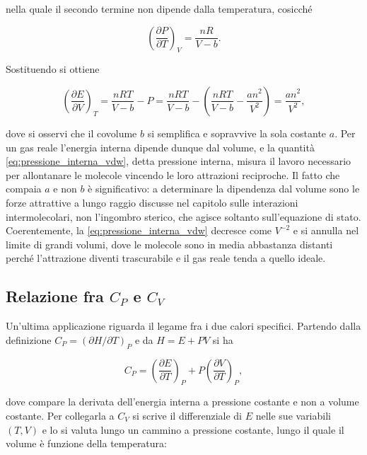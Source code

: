 nella quale il secondo termine non dipende dalla temperatura, cosicché

\begin{equation}
    \left(\frac{\partial P}{\partial T}\right)_V = \frac{nR}{V - b} .
    \label{eq:derivata_vdw}
\end{equation}

Sostituendo si ottiene

\begin{equation}
    \left(\frac{\partial E}{\partial V}\right)_T = \frac{nRT}{V - b} - P = \frac{nRT}{V - b} - \left(\frac{nRT}{V - b} - \frac{an^2}{V^2}\right) = \frac{an^2}{V^2} ,
    \label{eq:pressione_interna_vdw}
\end{equation}

dove si osservi che il covolume $b$ si semplifica e sopravvive la sola costante $a$.
Per un gas reale l'energia interna dipende dunque dal volume, e la quantità \eqref{eq:pressione_interna_vdw}, detta pressione interna, misura il lavoro necessario per allontanare le molecole vincendo le loro attrazioni reciproche.
Il fatto che compaia $a$ e non $b$ è significativo: a determinare la dipendenza dal volume sono le forze attrattive a lungo raggio discusse nel capitolo sulle interazioni intermolecolari, non l'ingombro sterico, che agisce soltanto sull'equazione di stato.
Coerentemente, la \eqref{eq:pressione_interna_vdw} decresce come $V^{-2}$ e si annulla nel limite di grandi volumi, dove le molecole sono in media abbastanza distanti perché l'attrazione diventi trascurabile e il gas reale tenda a quello ideale.

\subsection{Relazione fra $C_P$ e $C_V$}

Un'ultima applicazione riguarda il legame fra i due calori specifici.
Partendo dalla definizione $C_P = (\partial H/\partial T)_P$ e da $H = E + PV$ si ha

\begin{equation}
    C_P = \left(\frac{\partial E}{\partial T}\right)_P + P\left(\frac{\partial V}{\partial T}\right)_P ,
    \label{eq:cp_primopasso}
\end{equation}

dove compare la derivata dell'energia interna a pressione costante e non a volume costante.
Per collegarla a $C_V$ si scrive il differenziale di $E$ nelle sue variabili $(T,V)$ e lo si valuta lungo un cammino a pressione costante, lungo il quale il volume è funzione della temperatura:

